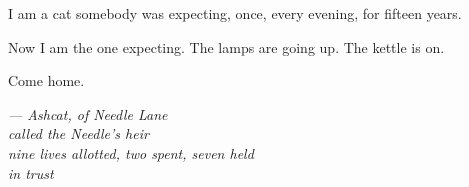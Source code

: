 I am a cat somebody was expecting, once, every evening, for fifteen years.

Now I am the one expecting. The lamps are going up. The kettle is on.

Come home.

\begin{center}
\vspace{2em}
{\itshape --- Ashcat, of Needle Lane\\
called the Needle's heir\\
nine lives allotted, two spent, seven held\\
in trust}
\end{center}

